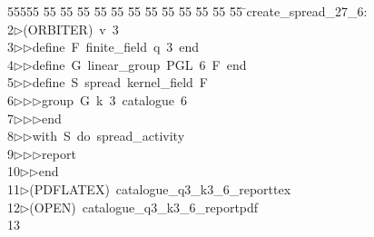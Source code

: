 %
%
\begin{tabbing}
55555 \= 55 \= 55 \= 55 \= 55 \= 55 \= 55 \= 55 \= 55 \= 55 \= 55 \= 55 \= 55 \= \>create\_spread\_27\_6:\\[0pt]
2\>$\triangleright$\>(ORBITER)\ v\ 3\ \\[0pt]
3\>$\triangleright$\>$\triangleright$\>define\ F\ finite\_field\ q\ 3\ end\ \\[0pt]
4\>$\triangleright$\>$\triangleright$\>define\ G\ linear\_group\ PGL\ 6\ F\ end\ \\[0pt]
5\>$\triangleright$\>$\triangleright$\>define\ S\ spread\ kernel\_field\ F\ \\[0pt]
6\>$\triangleright$\>$\triangleright$\>$\triangleright$\>group\ G\ k\ 3\ catalogue\ 6\ \\[0pt]
7\>$\triangleright$\>$\triangleright$\>$\triangleright$\>end\ \\[0pt]
8\>$\triangleright$\>$\triangleright$\>with\ S\ do\ spread\_activity\ \\[0pt]
9\>$\triangleright$\>$\triangleright$\>$\triangleright$\>report\ \\[0pt]
10\>$\triangleright$\>$\triangleright$\>end\\[0pt]
11\>$\triangleright$\>(PDFLATEX)\ catalogue\_q3\_k3\_6\_reporttex\\[0pt]
12\>$\triangleright$\>(OPEN)\ catalogue\_q3\_k3\_6\_reportpdf\\[0pt]
13\>\end{tabbing}

